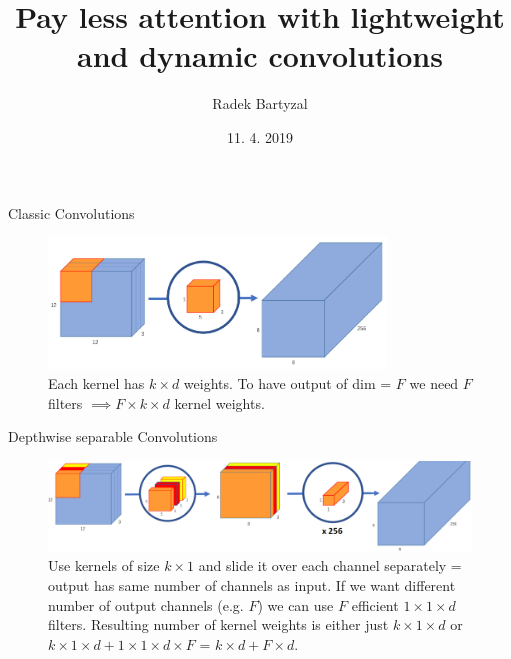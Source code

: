 \documentclass{beamer}
\begin{document}
\title{Pay less attention with lightweight and dynamic convolutions}  
\author{Radek Bartyzal}
\date{11. 4. 2019} 

\frame{\titlepage} 

\begin{frame}{Classic Convolutions}

\begin{figure}[h]
\includegraphics[width=0.8\textwidth]{img/classic_conv}
\caption{Each kernel has $k \times d$ weights. To have output of dim = $F$ we need $F$ filters $\implies F \times k \times d$ kernel weights. }
\end{figure}

\end{frame}

\begin{frame}{Depthwise separable Convolutions}

\begin{figure}[h]
\includegraphics[width=1.0\textwidth]{img/depthwise_conv}
\caption{Use kernels of size $k \times 1$ and slide it over each channel separately = output has same number of channels as input. If we want different number of output channels (e.g. $F$) we can use $F$ efficient $1 \times 1 \times d$ filters. Resulting number of kernel weights is either just $k \times 1 \times d$ or $k \times 1 \times d + 1 \times 1 \times d \times F$ = $k \times d + F \times d$.}
\end{figure}

\end{frame}
\end{document}
